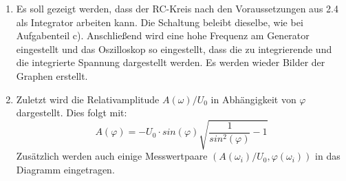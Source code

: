 \begin{enumerate}
       \item Es soll gezeigt werden, dass der RC-Kreis nach den Voraussetzungen aus 2.4 als
       Integrator arbeiten kann. Die Schaltung beleibt dieselbe, wie bei Aufgabenteil c).
       Anschließend wird eine hohe Frequenz am Generator eingestellt und das Oszilloskop so eingestellt, dass
       die zu integrierende und die integrierte Spannung dargestellt werden. Es werden wieder
       Bilder der Graphen erstellt.

       \item Zuletzt wird die Relativamplitude $A(\omega) / U_0$ in Abhängigkeit von $\varphi$ dargestellt.
       Dies folgt mit:
       \begin{equation}
         A(\varphi) = -U_0\cdot sin(\varphi)\sqrt{\frac{1}{sin^2(\varphi)}-1}
       \end{equation}
       Zusätzlich werden auch einige Messwertpaare $(A(\omega_i)/U_0,\varphi(\omega_i))$ in das Diagramm
        eingetragen.

\end{enumerate}
